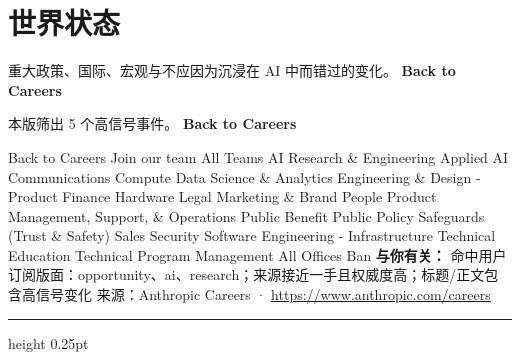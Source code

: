 \documentclass[10.5pt]{ctexart}
\begin{document}
\section*{世界状态}
{\color{ormuted} 重大政策、国际、宏观与不应因为沉浸在 AI 中而错过的变化。}
\vspace{2mm}
{\LARGE\bfseries Back to Careers}\par
\vspace{1mm}
{\color{ormuted} 本版筛出 5 个高信号事件。}
\vspace{3mm}
{\Large\bfseries Back to Careers}\par
Back to Careers Join our team All Teams AI Research \& Engineering Applied AI Communications Compute Data Science \& Analytics Engineering \& Design - Product Finance Hardware Legal Marketing \& Brand People Product Management, Support, \& Operations Public Benefit Public Policy Safeguards (Trust \& Safety) Sales Security Software Engineering - Infrastructure Technical Education Technical Program Management All Offices Ban
\textbf{与你有关：} 命中用户订阅版面：opportunity、ai、research；来源接近一手且权威度高；标题/正文包含高信号变化
{\footnotesize\color{ormuted} 来源：Anthropic Careers · \url{https://www.anthropic.com/careers}}
\vspace{4mm}
\hrule height 0.25pt
\vspace{3mm}
\end{document}
